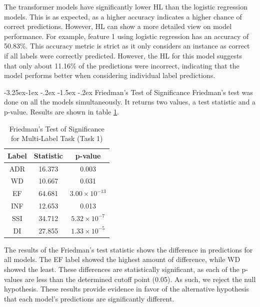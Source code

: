 \documentclass[10.7pt, onecolumn]{article}
\makeatletter
\renewcommand\subsubsection{\@startsection{subsubsection}{3}{\z@}%
	{-3.25ex\@plus -1ex \@minus -.2ex}%
    {-1.5ex \@plus -.2ex}%
    {\normalfont\itshape}}
\makeatother
\begin{document}
The transformer models have significantly lower HL than the logistic regression models. This is as expected, as a higher accuracy indicates a higher chance of correct predictions. However, HL can show a more detailed view on model performance. For example, feature 1 using logistic regression has an accuracy of 50.83\%. This accuracy metric is strict as it only considers an instance as correct if all labels were correctly predicted. However, the HL for this model suggests that only about 11.16\% of the predictions were incorrect, indicating that the model performs better when considering individual label predictions.

\subsubsection{Friedman's Test of Significance}
Friedman's test was done on all the models simultaneously. It returns two values, a test statistic and a p-value. Results are shown in table \ref{tab:friedmansTest}.

\begin{table}[H]
  \centering
  \begin{tabular}{|c|c|c|}
  \hline
  \textbf{Label} & \textbf{Statistic} & \textbf{p-value} \\ 
  \hline
  ADR & 16.373 & 0.003 \\ 
  \hline
  WD & 10.667 & 0.031 \\ 
  \hline
  EF & 64.681 & $3.00 \times 10^{-13}$ \\ 
  \hline
  INF & 12.653 & 0.013 \\ \hline
  SSI & 34.712 & $5.32 \times 10^{-7}$ \\ 
  \hline
  DI & 27.855 & $1.33 \times 10^{-5}$ \\ 
  \hline
  \end{tabular}
  \caption{Friedman's Test of Significance for Multi-Label Task (Task 1)}
  \label{tab:friedmansTest}
\end{table}

The results of the Friedman's test statistic shows the difference in predictions for all models. The EF label showed the highest amount of difference, while WD showed the least. These differences are statistically significant, as each of the p-values are less than the determined cutoff point (0.05). As such, we reject the null hypothesis. These results provide evidence in favor of the alternative hypothesis that each model's predictions are significantly different.
\end{document}

